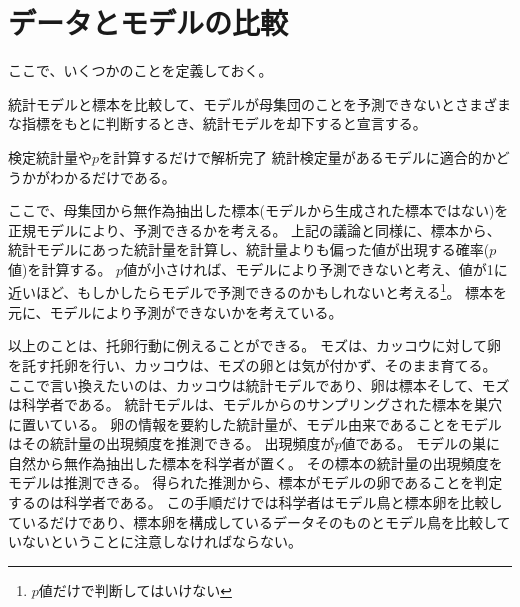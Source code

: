 \section{データとモデルの比較}
ここで、いくつかのことを定義しておく。
\begin{defi}
    統計モデルと標本を比較して、モデルが母集団のことを予測できないとさまざまな指標をもとに判断するとき、統計モデルを却下すると宣言する。
\end{defi}

\begin{SMbox}{検定統計量や$p$を計算するだけで解析完了}
    統計検定量があるモデルに適合的かどうかがわかるだけである。
\end{SMbox}


ここで、母集団から無作為抽出した標本(モデルから生成された標本ではない)を正規モデルにより、予測できるかを考える。
上記の議論と同様に、標本から、統計モデルにあった統計量を計算し、統計量よりも偏った値が出現する確率($p$値)を計算する。
$p$値が小さければ、モデルにより予測できないと考え、値が1に近いほど、もしかしたらモデルで予測できるのかもしれないと考える\footnote{$p$値だけで判断してはいけない}。
標本を元に、モデルにより予測ができないかを考えている。



以上のことは、托卵行動に例えることができる。
モズは、カッコウに対して卵を託す托卵を行い、カッコウは、モズの卵とは気が付かず、そのまま育てる。
ここで言い換えたいのは、カッコウは統計モデルであり、卵は標本そして、モズは科学者である。
統計モデルは、モデルからのサンプリングされた標本を巣穴に置いている。
卵の情報を要約した統計量が、モデル由来であることをモデルはその統計量の出現頻度を推測できる。
出現頻度が$p$値である。
モデルの巣に自然から無作為抽出した標本を科学者が置く。
その標本の統計量の出現頻度をモデルは推測できる。
得られた推測から、標本がモデルの卵であることを判定するのは科学者である。
この手順だけでは科学者はモデル鳥と標本卵を比較しているだけであり、標本卵を構成しているデータそのものとモデル鳥を比較していないということに注意しなければならない。


